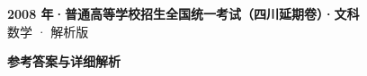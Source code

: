 \documentclass[zihao=-4, a4paper]{ctexart}
\begin{document}
\begin{center}
  {\Large\bfseries 2008 年·普通高等学校招生全国统一考试（四川延期卷）·文科}\\[4pt]
  {\large 数学 · 解析版}
\end{center}
\medskip
{}

\clearpage
{}
\begin{center}{\Large\bfseries 参考答案与详细解析}\end{center}
\medskip

\end{document}
